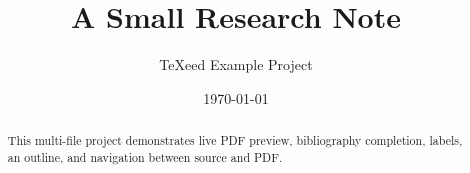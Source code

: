 \documentclass[11pt,a4paper]{article}
\title{A Small Research Note}
\author{TeXeed Example Project}
\date{\today}
\begin{document}
\maketitle
\begin{abstract}
This multi-file project demonstrates live PDF preview, bibliography completion,
labels, an outline, and navigation between source and PDF.
\end{abstract}

\tableofcontents

\newpage




\end{document}
